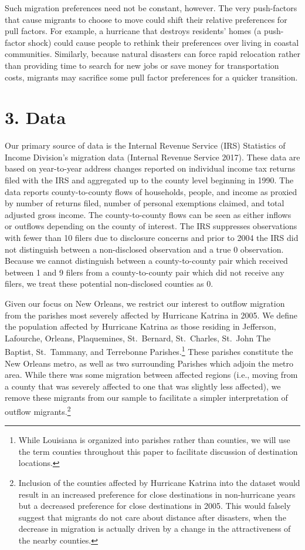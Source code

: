 \documentclass[]{article}
\begin{document}
Such migration preferences need not be constant, however. The very
push-factors that cause migrants to choose to move could shift their
relative preferences for pull factors. For example, a hurricane that
destroys residents' homes (a push-factor shock) could cause people to
rethink their preferences over living in coastal communities. Similarly,
because natural disasters can force rapid relocation rather than
providing time to search for new jobs or save money for transportation
costs, migrants may sacrifice some pull factor preferences for a quicker
transition.

\section{3. Data}\label{data}

Our primary source of data is the Internal Revenue Service (IRS)
Statistics of Income Division's migration data (Internal Revenue Service
2017). These data are based on year-to-year address changes reported on
individual income tax returns filed with the IRS and aggregated up to
the county level beginning in 1990. The data reports county-to-county
flows of households, people, and income as proxied by number of returns
filed, number of personal exemptions claimed, and total adjusted gross
income. The county-to-county flows can be seen as either inflows or
outflows depending on the county of interest. The IRS suppresses
observations with fewer than 10 filers due to disclosure concerns and
prior to 2004 the IRS did not distinguish between a non-disclosed
observation and a true 0 observation. Because we cannot distinguish
between a county-to-county pair which received between 1 and 9 filers
from a county-to-county pair which did not receive any filers, we treat
these potential non-disclosed counties as 0.

Given our focus on New Orleans, we restrict our interest to outflow
migration from the parishes most severely affected by Hurricane Katrina
in 2005. We define the population affected by Hurricane Katrina as those
residing in Jefferson, Lafourche, Orleans, Plaquemines, St.~Bernard,
St.~Charles, St.~John The Baptist, St.~Tammany, and Terrebonne
Parishes.\footnote{While Louisiana is organized into parishes rather
  than counties, we will use the term counties throughout this paper to
  facilitate discussion of destination locations.} These parishes
constitute the New Orleans metro, as well as two surrounding Parishes
which adjoin the metro area. While there was some migration between
affected regions (i.e., moving from a county that was severely affected
to one that was slightly less affected), we remove these migrants from
our sample to facilitate a simpler interpretation of outflow
migrants.\footnote{Inclusion of the counties affected by Hurricane
  Katrina into the dataset would result in an increased preference for
  close destinations in non-hurricane years but a decreased preference
  for close destinations in 2005. This would falsely suggest that
  migrants do not care about distance after disasters, when the decrease
  in migration is actually driven by a change in the attractiveness of
  the nearby counties.}
\end{document}
